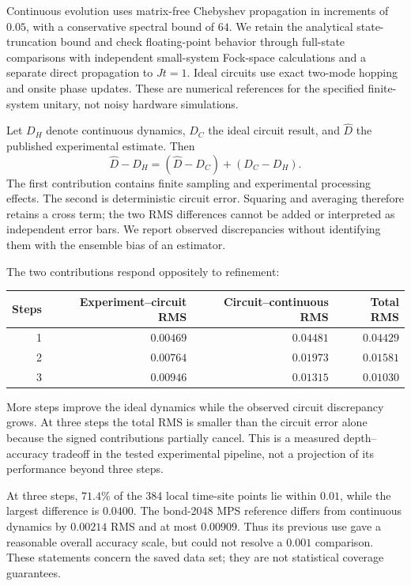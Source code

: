\documentclass[11pt]{article}
\begin{document}
Continuous evolution uses matrix-free Chebyshev propagation in increments
of $0.05$, with a conservative spectral bound of $64$. We retain the
analytical state-truncation bound and check floating-point behavior through
full-state comparisons with independent small-system Fock-space calculations
and a separate direct propagation to $Jt=1$. Ideal circuits use exact
two-mode hopping and onsite phase updates. These are numerical references
for the specified finite-system unitary, not noisy hardware simulations.

Let $D_H$ denote continuous dynamics, $D_C$ the ideal circuit result, and
$\widehat D$ the published experimental estimate. Then
\begin{equation}\label{eq:willow-error-decomposition}
 \widehat D-D_H=(\widehat D-D_C)+(D_C-D_H).
\end{equation}
The first contribution contains finite sampling and experimental processing
effects. The second is deterministic circuit error. Squaring and averaging
therefore retains a cross term; the two RMS differences cannot be added or
interpreted as independent error bars. We report observed discrepancies
without identifying them with the ensemble bias of an estimator.

The two contributions respond oppositely to refinement:
\begin{center}
\small
\begin{tabular}{rrrr}
\toprule
Steps & Experiment--circuit RMS & Circuit--continuous RMS & Total RMS\\
\midrule
1 & $0.00469$ & $0.04481$ & $0.04429$\\
2 & $0.00764$ & $0.01973$ & $0.01581$\\
3 & $0.00946$ & $0.01315$ & $0.01030$\\
\bottomrule
\end{tabular}
\end{center}
More steps improve the ideal dynamics while the observed circuit discrepancy
grows. At three steps the total RMS is smaller than the circuit error alone
because the signed contributions partially cancel. This is a measured
depth--accuracy tradeoff in the tested experimental pipeline, not a
projection of its performance beyond three steps.

At three steps, $71.4\%$ of the 384 local time-site points lie within
$0.01$, while the largest difference is $0.0400$. The bond-2048 MPS reference
differs from continuous dynamics by $0.00214$ RMS and at most $0.00909$.
Thus its previous use gave a reasonable overall accuracy scale, but could
not resolve a $0.001$ comparison. These statements concern the saved data
set; they are not statistical coverage guarantees.
\end{document}
